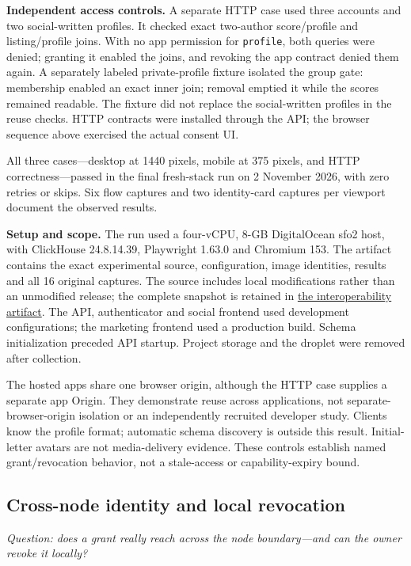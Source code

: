 \documentclass[sigconf, nonacm]{acmart}
\newcommand{\artifactbase}{https://github.com/jacoby149/web10}
\newcommand{\domainartifactrev}{26720acba859c7eb03fc5d26a6221cdde5b764a1}
\newcommand{\domainartifactdir}[2]{\href{\artifactbase/tree/\domainartifactrev/#1}{#2}}
\begin{document}
\textbf{Independent access controls.} A separate HTTP case used three
accounts and two social-written profiles. It checked exact two-author
score/profile and listing/profile joins. With no app permission for
\texttt{profile}, both queries were denied; granting it enabled the joins,
and revoking the app contract denied them again. A separately labeled
private-profile fixture isolated the group gate: membership enabled an exact
inner join; removal emptied it while the scores remained readable. The fixture
did not replace the social-written profiles in the reuse checks. HTTP
contracts were installed through the API; the browser sequence above
exercised the actual consent UI.

All three cases---desktop at 1440 pixels, mobile at 375 pixels, and HTTP
correctness---passed in the final fresh-stack run on 2 November 2026, with
zero retries or skips. Six flow captures and two identity-card captures per
viewport document the observed results.

\textbf{Setup and scope.} The run used a four-vCPU, 8-GB DigitalOcean sfo2
host, with ClickHouse 24.8.14.39, Playwright 1.63.0 and Chromium 153. The
artifact contains the exact experimental source, configuration, image
identities, results and all 16 original captures. The source includes local
modifications rather than an unmodified release; the complete snapshot is
retained in \domainartifactdir{research/interoperability-demo}{the
interoperability artifact}. The API, authenticator and social frontend used
development configurations; the marketing frontend used a production build.
Schema initialization preceded API startup. Project storage and the droplet
were removed after collection.

The hosted apps share one browser origin, although the HTTP case supplies a
separate app Origin. They demonstrate reuse across applications, not
separate-browser-origin isolation or an independently recruited developer
study. Clients know the profile format; automatic schema discovery is outside
this result. Initial-letter avatars are not media-delivery evidence. These
controls establish named grant/revocation behavior, not a stale-access or
capability-expiry bound.

\subsection{Cross-node identity and local revocation}
\label{sec:federation-results}

\emph{Question: does a grant really reach across the node boundary---and can
the owner revoke it locally?}
\end{document}
